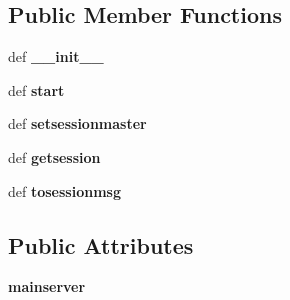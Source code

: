 \subsection*{Public Member Functions}
\begin{DoxyCompactItemize}
\item 
\hypertarget{classcore_1_1coreserver_1_1_core_aux_server_af96763fadad5f7a78215e88ec82ddbcc}{def {\bfseries \+\_\+\+\_\+init\+\_\+\+\_\+}}\label{classcore_1_1coreserver_1_1_core_aux_server_af96763fadad5f7a78215e88ec82ddbcc}

\item 
\hypertarget{classcore_1_1coreserver_1_1_core_aux_server_a9f63aad31a01c14948ffb7eec63325b8}{def {\bfseries start}}\label{classcore_1_1coreserver_1_1_core_aux_server_a9f63aad31a01c14948ffb7eec63325b8}

\item 
\hypertarget{classcore_1_1coreserver_1_1_core_aux_server_aa4e1c1d16cbe61c4629ff9e4baeea85a}{def {\bfseries setsessionmaster}}\label{classcore_1_1coreserver_1_1_core_aux_server_aa4e1c1d16cbe61c4629ff9e4baeea85a}

\item 
\hypertarget{classcore_1_1coreserver_1_1_core_aux_server_a6eec207b02172ea76dbc772df7e15551}{def {\bfseries getsession}}\label{classcore_1_1coreserver_1_1_core_aux_server_a6eec207b02172ea76dbc772df7e15551}

\item 
\hypertarget{classcore_1_1coreserver_1_1_core_aux_server_ac827e9dc395c48c53c2ce20ec2ee1d5c}{def {\bfseries tosessionmsg}}\label{classcore_1_1coreserver_1_1_core_aux_server_ac827e9dc395c48c53c2ce20ec2ee1d5c}

\end{DoxyCompactItemize}
\subsection*{Public Attributes}
\begin{DoxyCompactItemize}
\item 
\hypertarget{classcore_1_1coreserver_1_1_core_aux_server_a725b4706ee40244571f24ab30ceee36f}{{\bfseries mainserver}}\label{classcore_1_1coreserver_1_1_core_aux_server_a725b4706ee40244571f24ab30ceee36f}

\end{DoxyCompactItemize}
